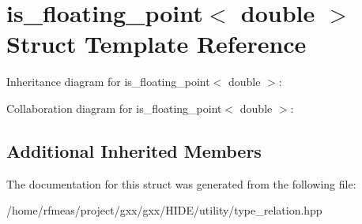 \hypertarget{structis__floating__point_3_01double_01_4}{}\section{is\+\_\+floating\+\_\+point$<$ double $>$ Struct Template Reference}
\label{structis__floating__point_3_01double_01_4}


Inheritance diagram for is\+\_\+floating\+\_\+point$<$ double $>$\+:


Collaboration diagram for is\+\_\+floating\+\_\+point$<$ double $>$\+:
\subsection*{Additional Inherited Members}


The documentation for this struct was generated from the following file\+:\begin{DoxyCompactItemize}
\item 
/home/rfmeas/project/gxx/gxx/\+H\+I\+D\+E/utility/type\+\_\+relation.\+hpp\end{DoxyCompactItemize}
